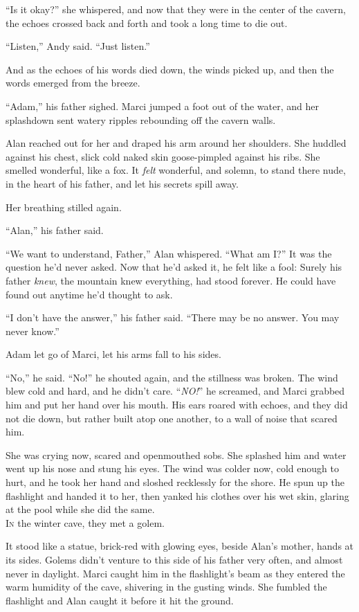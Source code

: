 \documentclass{article}
\begin{document}
``Is it okay?'' she whispered, and now that they were in the center of
the cavern, the echoes crossed back and forth and took a long time to
die out.

``Listen,'' Andy said.  ``Just listen.''

And as the echoes of his words died down, the winds picked up, and
then the words emerged from the breeze.

``Adam,'' his father sighed.  Marci jumped a foot out of the water,
and her splashdown sent watery ripples rebounding off the cavern
walls.

Alan reached out for her and draped his arm around her shoulders.  She
huddled against his chest, slick cold naked skin goose-pimpled against
his ribs.  She smelled wonderful, like a fox.  It \textit{felt}
wonderful, and solemn, to stand there nude, in the heart of his
father, and let his secrets spill away.

Her breathing stilled again.

``Alan,'' his father said.

``We want to understand, Father,'' Alan whispered.  ``What am I?'' It
was the question he'd never asked.  Now that he'd asked it, he felt
like a fool:  Surely his father \textit{knew}, the mountain knew
everything, had stood forever.  He could have found out anytime he'd
thought to ask.

``I don't have the answer,'' his father said.  ``There may be no
answer.  You may never know.''

Adam let go of Marci, let his arms fall to his sides.

``No,'' he said.  ``No!'' he shouted again, and the stillness was
broken.  The wind blew cold and hard, and he didn't care. 
``\textit{NO!}'' he screamed, and Marci grabbed him and put her hand
over his mouth.  His ears roared with echoes, and they did not die
down, but rather built atop one another, to a wall of noise that
scared him.

She was crying now, scared and openmouthed sobs.  She splashed him and
water went up his nose and stung his eyes.  The wind was colder now,
cold enough to hurt, and he took her hand and sloshed recklessly for
the shore.  He spun up the flashlight and handed it to her, then
yanked his clothes over his wet skin, glaring at the pool while she
did the same.
\\
\lettrine[lines=3, lhang=.5, nindent=0pt, findent=2pt]{I}{n} the winter cave, they met a golem.

It stood like a statue, brick-red with glowing eyes, beside Alan's
mother, hands at its sides.  Golems didn't venture to this side of his
father very often, and almost never in daylight.  Marci caught him in
the flashlight's beam as they entered the warm humidity of the cave,
shivering in the gusting winds.  She fumbled the flashlight and Alan
caught it before it hit the ground.
\end{document}
